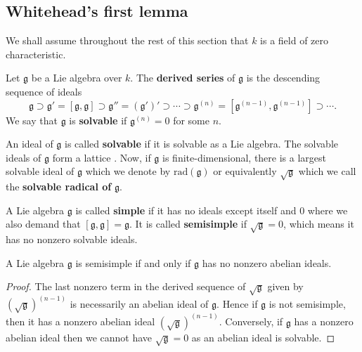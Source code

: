 \subsection{Whitehead's first lemma} %
\label{sub:Whitehead's first lemma}
We shall assume throughout the rest of this section that $ k $ is a field of zero characteristic.
\begin{definition}
  Let $ \mathfrak{g} $ be a Lie algebra over $ k $. The \textbf{derived series} of $ \mathfrak{g} $ is the descending sequence of ideals
  \begin{equation}
    \mathfrak{g} \supset \mathfrak{g}'=[\mathfrak{g}, \mathfrak{g}] \supset \mathfrak{g}''=(\mathfrak{g}')' \supset \cdots \supset \mathfrak{g}^{(n)}=[\mathfrak{g}^{(n-1)}, \mathfrak{g}^{(n- 1)}] \supset \cdots.
  \end{equation}
  We say that $ \mathfrak{g} $ is \textbf{solvable} if $ \mathfrak{g}^{(n)} = 0 $ for some $ n $.
\end{definition}

\begin{definition}
  An ideal of $ \mathfrak{g} $ is called \textbf{solvable} if it is solvable as a Lie algebra. The solvable ideals of $ \mathfrak{g} $ form a lattice \cite[I.7]{jacobson1979lie}. Now, if $ \mathfrak{g} $ is finite-dimensional, there is a largest solvable ideal of $ \mathfrak{g} $ which we denote by $ \text{rad}(\mathfrak{g}) $ or equivalently $ \sqrt{\mathfrak{g}} $ which we call the \textbf{solvable radical of} $ \mathfrak{g} $.
\end{definition}

\begin{definition}
  A Lie algebra $ \mathfrak{g} $ is called \textbf{simple} if it has no ideals except itself and $ 0 $ where we also demand that $ [\mathfrak{g}, \mathfrak{g}]=\mathfrak{g} $. It is called \textbf{semisimple} if $ \sqrt{\mathfrak{g}}=0 $, which means it has no nonzero solvable ideals.
\end{definition}
\begin{lemma}
  A Lie algebra $ \mathfrak{g} $ is semisimple if and only if $ \mathfrak{g} $ has no nonzero abelian ideals.
\end{lemma}
\begin{proof}
  The last nonzero term in the derived sequence of $ \sqrt{\mathfrak{g}} $ given by $ (\sqrt{\mathfrak{g}})^{(n-1)} $ is necessarily an abelian ideal of $ \mathfrak{g} $. Hence if $ \mathfrak{g} $ is not semisimple, then it has a nonzero abelian ideal $ (\sqrt{\mathfrak{g}})^{(n -1)} $. Conversely, if $ \mathfrak{g} $ has a nonzero abelian ideal then we cannot have $ \sqrt{\mathfrak{g}}=0 $ as an abelian ideal is solvable.
\end{proof}

